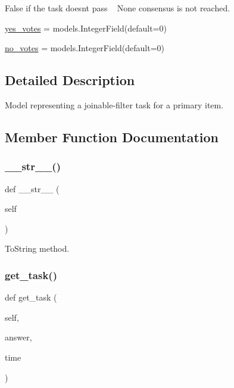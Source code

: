 \begin{DoxyCompactItemize}
\begin{DoxyCompactList}
 False if the task doesn\textquotesingle{}t pass ~\newline
 None consensus is not reached. \end{DoxyCompactList}\item 
\mbox{\hyperlink{classjoinapp_1_1models_1_1task__management__models_1_1_j_f_task_ab50f50bde4c2c1524460c48def8f27f3}{yes\+\_\+votes}} = models.\+Integer\+Field(default=0)
\item 
\mbox{\hyperlink{classjoinapp_1_1models_1_1task__management__models_1_1_j_f_task_a1e1b32e1e9767af8d38c4e2de888919f}{no\+\_\+votes}} = models.\+Integer\+Field(default=0)
\end{DoxyCompactItemize}


\subsection{Detailed Description}
Model representing a joinable-\/filter task for a primary item. 

\subsection{Member Function Documentation}
\mbox{\label{classjoinapp_1_1models_1_1task__management__models_1_1_j_f_task_a23e8041ce1015febe4fdace3225714f9}} 
\subsubsection{\texorpdfstring{\_\_str\_\_()}{\_\_str\_\_()}}
{\footnotesize\ttfamily def \+\_\+\+\_\+str\+\_\+\+\_\+ (\begin{DoxyParamCaption}\item[{}]{self }\end{DoxyParamCaption})}



To\+String method. 

\mbox{\label{classjoinapp_1_1models_1_1task__management__models_1_1_j_f_task_a5c2eb6f87a32af834dd29469a6189f0c}} 
\subsubsection{\texorpdfstring{get\_task()}{get\_task()}}
{\footnotesize\ttfamily def get\+\_\+task (\begin{DoxyParamCaption}\item[{}]{self,  }\item[{}]{answer,  }\item[{}]{time }\end{DoxyParamCaption})}



